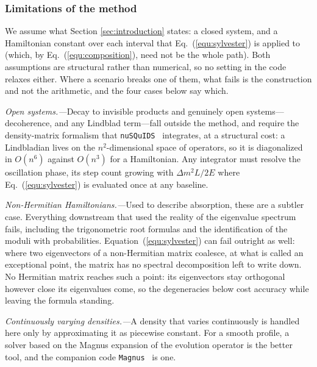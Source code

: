 \documentclass[final,5p,times,twocolumn,sort,compress]{elsarticle}
\newcommand{\eq}{Eq.}
\newcommand{\equ}[1]{\eq~(\ref{equ:#1})}
\newcounter{bla}
\begin{document}

\subsubsection{Limitations of the method}

We assume what Section \ref{sec:introduction} states: a closed system, and a Hamiltonian constant over each interval that \equ{sylvester} is applied to (which, by \equ{composition}, need not be the whole path).  Both assumptions are structural rather than numerical, so no setting in the code relaxes either.  Where a scenario breaks one of them, what fails is the construction and not the arithmetic, and the four cases below say which.

\smallskip

\textit{Open systems.---}Decay to invisible products and genuinely open systems---decoherence, and any Lindblad term---fall outside the method, and require the density-matrix formalism that {\tt nuSQuIDS}\ \cite{Delgado:2014kpa, NuSQuIDS} integrates, at a structural cost: a Lindbladian lives on the $n^2$-dimensional space of operators, so it is diagonalized in $O(n^6)$ against $O(n^3)$ for a Hamiltonian.  Any integrator must resolve the oscillation phase, its step count growing with $\Delta m^2 L / 2E$ where \equ{sylvester} is evaluated once at any baseline.

\smallskip

\textit{Non-Hermitian Hamiltonians.---}Used to describe absorption, these are a subtler case.  Everything downstream that used the reality of the eigenvalue spectrum fails, including the trigonometric root formulas and the identification of the moduli with probabilities.  Equation~(\ref{equ:sylvester}) can fail outright as well: where two eigenvectors of a non-Hermitian matrix coalesce, at what is called an exceptional point, the matrix has no spectral decomposition left to write down.  No Hermitian matrix reaches such a point: its eigenvectors stay orthogonal however close its eigenvalues come, so the degeneracies below cost accuracy while leaving the formula standing.

\smallskip

\textit{Continuously varying densities.---}A density that varies continuously is handled here only by approximating it as piecewise constant.  For a smooth profile, a solver based on the Magnus expansion of the evolution operator is the better tool, and the companion code {\tt Magnus}\ \cite{Magnus} is one.
\end{document}
